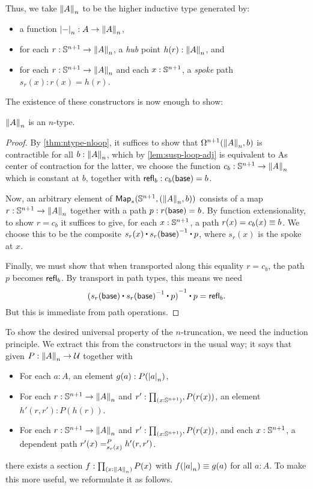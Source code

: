 Thus, we take $\trunc nA$ to be the higher inductive type generated by:
\begin{itemize}
\item a function $\tproj n- : A \to \trunc n A$,
\item for each $r:\Sn^{n+1} \to \trunc n A$, a \emph{hub} point $h(r):\trunc n A$, and
\item for each $r:\Sn^{n+1} \to \trunc n A$ and each $x:\Sn^{n+1}$, a \emph{spoke} path $s_r(x):r(x) = h(r)$.
\end{itemize}

\noindent
The existence of these constructors is now enough to show:

\begin{lem}
  $\trunc n A$ is an $n$-type.
\end{lem}
\begin{proof}
  By \autoref{thm:ntype-nloop}, it suffices to show that $\Omega ^{n+1}(\trunc nA,b)$ is contractible for all $b:\trunc nA$, which by
\autoref{lem:susp-loop-adj} is equivalent to 
  As center of contraction for the latter, we choose the function $c_b:\Sn^{n+1} \to \trunc nA$ which is constant at $b$, together with
$\refl b : c_b(\base) = b$.

  Now, an arbitrary element of $\Map_*(\Sn^{n+1},(\trunc nA,b))$ consists of a map $r:\Sn^{n+1} \to \trunc n A$ together with a path
$p:r(\base)=b$.
  By function extensionality, to show $r = c_b$ it suffices to give, for each $x:\Sn^{n+1}$, a path $r(x)=c_b(x) \jdeq b$.
  We choose this to be the composite $s_r(x) \ct \opp{s_r(\base)} \ct p$, where $s_r(x)$ is the spoke at $x$.


  Finally, we must show that when transported along this equality $r=c_b$, the path $p$ becomes $\refl b$.
  By transport in path types, this means we need
  \[\opp{(s_r(\base) \ct \opp{s_r(\base)} \ct p)} \ct p = \refl b.\]
  But this is immediate from path operations.
\end{proof}

To show the desired universal property of the $n$-truncation, we need the induction principle.
We extract this from the constructors in the usual way; it says that given $P:\trunc nA\to\type$ together with
\begin{itemize}
\item For each $a:A$, an element $g(a) : P(\tproj na)$,
\item For each $r:\Sn^{n+1} \to \trunc n A$ and $r':\prd{x:\Sn^{n+1}}, P(r(x))$, an element $h'(r,r'):P(h(r))$.
\item For each $r:\Sn^{n+1} \to \trunc n A$ and $r':\prd{x:\Sn^{n+1}}, P(r(x))$, and each $x:\Sn^{n+1}$, a dependent path
$\dpath{P}{s_r(x)}{r'(x)}{h'(r,r')}$.
\end{itemize}
there exists a section $f:\prd{x:\trunc n A} P(x)$ with $f(\tproj n a) \jdeq g(a)$ for all $a:A$.
To make this more useful, we reformulate it as follows.

